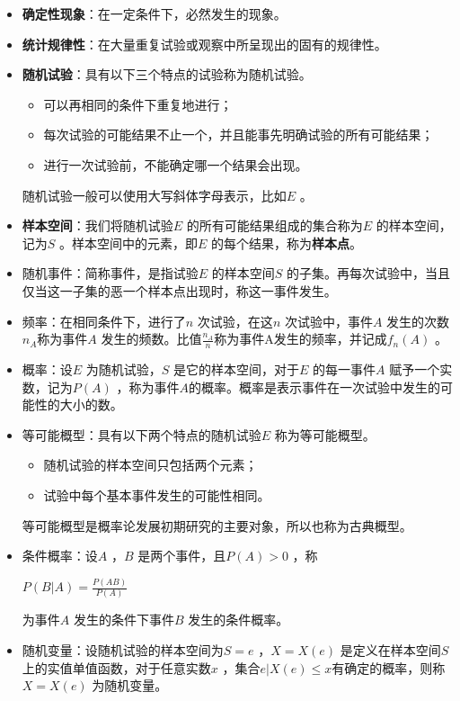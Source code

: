 \documentclass[11pt]{book}
\newcounter{#2}
\newcounter{#2}[#1]
\numberwithin{#2}{#1}
\begin{document}
	\begin{itemize}
		\item \textbf{确定性现象}：在一定条件下，必然发生的现象。
		\item \textbf{统计规律性}：在大量重复试验或观察中所呈现出的固有的规律性。
		\item \textbf{随机试验}：具有以下三个特点的试验称为随机试验。
		\begin{itemize}
			\item 可以再相同的条件下重复地进行；
			\item 每次试验的可能结果不止一个，并且能事先明确试验的所有可能结果；
			\item 进行一次试验前，不能确定哪一个结果会出现。
		\end{itemize} 
	
	随机试验一般可以使用大写斜体字母表示，比如$ E $ 。
		\item \textbf{样本空间}：我们将随机试验$ E $ 的所有可能结果组成的集合称为$ E $ 的样本空间，记为$ S $  。样本空间中的元素，即$ E $ 的每个结果，称为\textbf{样本点}。
		\item 随机事件：简称事件，是指试验$ E$ 的样本空间$ S$ 的子集。再每次试验中，当且仅当这一子集的恶一个样本点出现时，称这一事件发生。
		\item 频率：在相同条件下，进行了$ n $ 次试验，在这$ n $ 次试验中，事件$ A $ 发生的次数$ n_A $称为事件$ A $ 发生的频数。比值$ \frac{n_A}{n} $称为事件A发生的频率，并记成$ f_n (A) $ 。
		\item 概率：设$ E $ 为随机试验，$ S $ 是它的样本空间，对于$ E $ 的每一事件$ A $ 赋予一个实数，记为$ P(A) $ ，称为事件$ A $的概率。概率是表示事件在一次试验中发生的可能性的大小的数。
		\item 等可能概型：具有以下两个特点的随机试验$ E $ 称为等可能概型。
		\begin{itemize}
			\item 随机试验的样本空间只包括两个元素；
			\item 试验中每个基本事件发生的可能性相同。
		\end{itemize}
		等可能概型是概率论发展初期研究的主要对象，所以也称为古典概型。
		\item 条件概率：设$ A $ ，$ B $ 是两个事件，且$ P(A)>0 $ ，称
		\begin{center}
			$ P(B|A)=\frac{P(AB)}{P(A)} $
		\end{center}
		为事件$ A $ 发生的条件下事件$ B $ 发生的条件概率。
		\item 随机变量：设随机试验的样本空间为$ S={e}$ ，$ X=X(e)$ 是定义在样本空间$ S $上的实值单值函数，对于任意实数$ x$ ，集合$ {e|X(e)\le x}$有确定的概率，则称$ X=X(e)$ 为随机变量。

\end{itemize}
\end{document}
